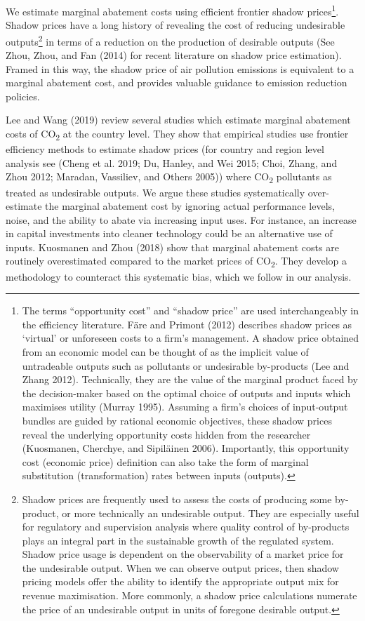 \documentclass[
  10pt,
]{article}
\begin{document}
We estimate marginal abatement costs using efficient frontier shadow
prices\footnote{The terms ``opportunity cost'' and ``shadow price'' are
  used interchangeably in the efficiency literature. Färe and Primont
  (2012) describes shadow prices as `virtual' or unforeseen costs to a
  firm's management. A shadow price obtained from an economic model can
  be thought of as the implicit value of untradeable outputs such as
  pollutants or undesirable by-products (Lee and Zhang 2012).
  Technically, they are the value of the marginal product faced by the
  decision-maker based on the optimal choice of outputs and inputs which
  maximises utility (Murray 1995). Assuming a firm's choices of
  input-output bundles are guided by rational economic objectives, these
  shadow prices reveal the underlying opportunity costs hidden from the
  researcher (Kuosmanen, Cherchye, and Sipiläinen 2006). Importantly,
  this opportunity cost (economic price) definition can also take the
  form of marginal substitution (transformation) rates between inputs
  (outputs).}. Shadow prices have a long history of revealing the cost
of reducing undesirable outputs\footnote{Shadow prices are frequently
  used to assess the costs of producing some by-product, or more
  technically an undesirable output. They are especially useful for
  regulatory and supervision analysis where quality control of
  by-products plays an integral part in the sustainable growth of the
  regulated system. Shadow price usage is dependent on the observability
  of a market price for the undesirable output. When we can observe
  output prices, then shadow pricing models offer the ability to
  identify the appropriate output mix for revenue maximisation. More
  commonly, a shadow price calculations numerate the price of an
  undesirable output in units of foregone desirable output.} in terms of
a reduction on the production of desirable outputs (See Zhou, Zhou, and
Fan (2014) for recent literature on shadow price estimation). Framed in
this way, the shadow price of air pollution emissions is equivalent to a
marginal abatement cost, and provides valuable guidance to emission
reduction policies.

Lee and Wang (2019) review several studies which estimate marginal
abatement costs of CO\textsubscript{2} at the country level. They show
that empirical studies use frontier efficiency methods to estimate
shadow prices (for country and region level analysis see (Cheng et al.
2019; Du, Hanley, and Wei 2015; Choi, Zhang, and Zhou 2012; Maradan,
Vassiliev, and Others 2005)) where CO\textsubscript{2} pollutants as
treated as undesirable outputs. We argue these studies systematically
over-estimate the marginal abatement cost by ignoring actual performance
levels, noise, and the ability to abate via increasing input uses. For
instance, an increase in capital investments into cleaner technology
could be an alternative use of inputs. Kuosmanen and Zhou (2018) show
that marginal abatement costs are routinely overestimated compared to
the market prices of CO\textsubscript{2}. They develop a methodology to
counteract this systematic bias, which we follow in our analysis.
\end{document}

